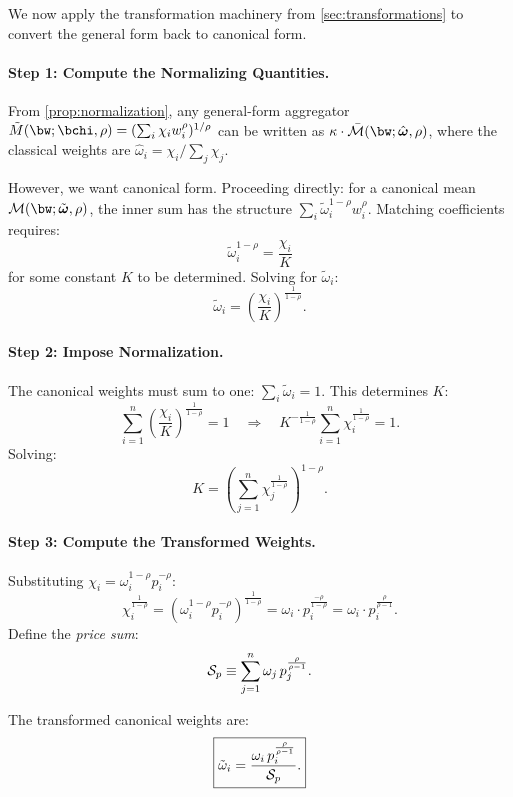 We now apply the transformation machinery from \cref{sec:transformations} to convert the general form back to canonical form.

\paragraph{Step 1: Compute the Normalizing Quantities.}
From \cref{prop:normalization}, any general-form aggregator $\tilde{M}(\bw; \bchi, \rho) = (\sum_i \chi_i w_i^\rho)^{1/\rho}$ can be written as $\kappa \cdot \Mbar(\bw; \hat{\bom}, \rho)$, where the classical weights are $\hat{\omega}_i = \chi_i / \sum_j \chi_j$.

However, we want canonical form. Proceeding directly: for a canonical mean $\M(\bw; \tilde{\bom}, \rho)$, the inner sum has the structure $\sum_i \tilde{\omega}_i^{1-\rho} w_i^\rho$. Matching coefficients requires:
\[
\tilde{\omega}_i^{1-\rho} = \frac{\chi_i}{K}
\]
for some constant $K$ to be determined. Solving for $\tilde{\omega}_i$:
\[
\tilde{\omega}_i = \left( \frac{\chi_i}{K} \right)^{\frac{1}{1-\rho}}.
\]

\paragraph{Step 2: Impose Normalization.}
The canonical weights must sum to one: $\sum_i \tilde{\omega}_i = 1$. This determines $K$:
\[
\sum_{i=1}^{n} \left( \frac{\chi_i}{K} \right)^{\frac{1}{1-\rho}} = 1 \quad \Longrightarrow \quad K^{-\frac{1}{1-\rho}} \sum_{i=1}^{n} \chi_i^{\frac{1}{1-\rho}} = 1.
\]
Solving:
\begin{equation}
\label{eq:K-solution}
K = \left( \sum_{j=1}^{n} \chi_j^{\frac{1}{1-\rho}} \right)^{1-\rho}.
\end{equation}

\paragraph{Step 3: Compute the Transformed Weights.}
Substituting $\chi_i = \omega_i^{1-\rho} p_i^{-\rho}$:
\[
\chi_i^{\frac{1}{1-\rho}} = \left( \omega_i^{1-\rho} p_i^{-\rho} \right)^{\frac{1}{1-\rho}} = \omega_i \cdot p_i^{\frac{-\rho}{1-\rho}} = \omega_i \cdot p_i^{\frac{\rho}{\rho-1}}.
\]
Define the \emph{price sum}:
\begin{equation}
\label{eq:price-sum}
\mathcal{S}_p \equiv \sum_{j=1}^{n} \omega_j \, p_j^{\frac{\rho}{\rho-1}}.
\end{equation}

The transformed canonical weights are:
\begin{equation}
\label{eq:transformed-weights}
\boxed{\tilde{\omega}_i = \frac{\omega_i \, p_i^{\frac{\rho}{\rho-1}}}{\mathcal{S}_p}.}
\end{equation}

